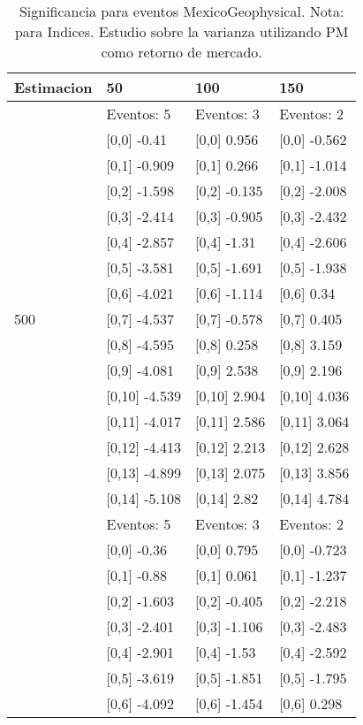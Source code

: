 \begin{table}

\caption{Significancia para eventos MexicoGeophysical. Nota: para Indices. Estudio sobre la varianza utilizando PM como retorno de mercado.}
\centering
\begin{tabular}[t]{llll}
\toprule
Estimacion & 50 & 100 & 150\\
\midrule
 & Eventos:  5 & Eventos:  3 & Eventos:  2\\
 & {}[0,0] -0.41 & {}[0,0] 0.956 & {}[0,0] -0.562\\
 & {}[0,1] -0.909 & {}[0,1] 0.266 & {}[0,1] -1.014\\
 & {}[0,2] -1.598 & {}[0,2] -0.135 & {}[0,2] -2.008\\
 & {}[0,3] -2.414 & {}[0,3] -0.905 & {}[0,3] -2.432\\
\addlinespace
 & {}[0,4] -2.857 & {}[0,4] -1.31 & {}[0,4] -2.606\\
 & {}[0,5] -3.581 & {}[0,5] -1.691 & {}[0,5] -1.938\\
 & {}[0,6] -4.021 & {}[0,6] -1.114 & {}[0,6] 0.34\\
500 & {}[0,7] -4.537 & {}[0,7] -0.578 & {}[0,7] 0.405\\
 & {}[0,8] -4.595 & {}[0,8] 0.258 & {}[0,8] 3.159\\
\addlinespace
 & {}[0,9] -4.081 & {}[0,9] 2.538 & {}[0,9] 2.196\\
 & {}[0,10] -4.539 & {}[0,10] 2.904 & {}[0,10] 4.036\\
 & {}[0,11] -4.017 & {}[0,11] 2.586 & {}[0,11] 3.064\\
 & {}[0,12] -4.413 & {}[0,12] 2.213 & {}[0,12] 2.628\\
 & {}[0,13] -4.899 & {}[0,13] 2.075 & {}[0,13] 3.856\\
\addlinespace
 & {}[0,14] -5.108 & {}[0,14] 2.82 & {}[0,14] 4.784\\
 & Eventos:  5 & Eventos:  3 & Eventos:  2\\
 & {}[0,0] -0.36 & {}[0,0] 0.795 & {}[0,0] -0.723\\
 & {}[0,1] -0.88 & {}[0,1] 0.061 & {}[0,1] -1.237\\
 & {}[0,2] -1.603 & {}[0,2] -0.405 & {}[0,2] -2.218\\
\addlinespace
 & {}[0,3] -2.401 & {}[0,3] -1.106 & {}[0,3] -2.483\\
 & {}[0,4] -2.901 & {}[0,4] -1.53 & {}[0,4] -2.592\\
 & {}[0,5] -3.619 & {}[0,5] -1.851 & {}[0,5] -1.795\\
 & {}[0,6] -4.092 & {}[0,6] -1.454 & {}[0,6] 0.298\\

\end{tabular}
\end{table}
